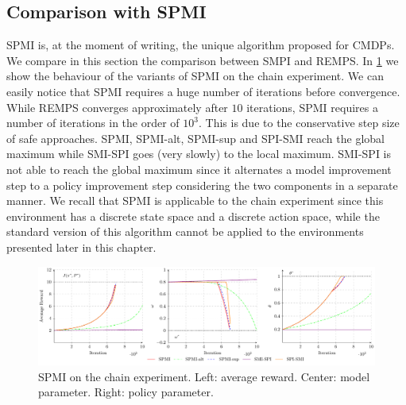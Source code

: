 \subsection{Comparison with SPMI}
SPMI is, at the moment of writing, the unique algorithm proposed for CMDPs. We compare in this section the comparison between SMPI and REMPS.
In \cref{fig:chain-spmi} we show the behaviour of the variants of SPMI on the chain experiment. We can easily notice that SPMI requires a huge number of iterations before convergence. While REMPS converges approximately after $10$ iterations, SPMI requires a number of iterations in the order of $10^3$. This is due to the conservative step size of safe approaches. SPMI, SPMI-alt, SPMI-sup and SPI-SMI reach the global maximum while SMI-SPI goes (very slowly) to the local maximum. SMI-SPI is not able to reach the global maximum since it alternates a model improvement step to a policy improvement step considering the two components in a separate manner. \newline
We recall that SPMI is applicable to the chain experiment since this environment has a discrete state space and a discrete action space, while the standard version of this algorithm cannot be applied to the environments presented later in this chapter.
 
\begin{figure}[!tb]
\centering
	\includegraphics[width=1\textwidth]{plots/chain/plot_spmi}
	\caption{SPMI on the chain experiment. Left: average reward. Center: model parameter. Right: policy parameter.}
	\label{fig:chain-spmi}
\end{figure}

\clearpage


